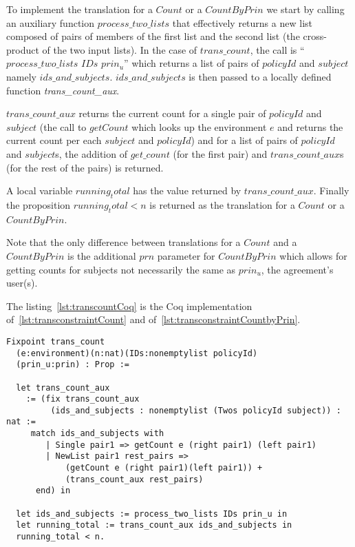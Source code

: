 To implement the translation for a $Count$ or a $CountByPrin$ we start by calling an auxiliary function $process\_two\_lists$ that effectively returns a new list composed of pairs of members of the first list and the second list (the cross-product of the two input lists). In the case of $trans\_count$, the call is ``$process\_two\_lists$ $IDs$ $prin_u$'' which returns a list of pairs of $policyId$ and $subject$ namely $ids\_and\_subjects$. $ids\_and\_subjects$ is then passed to a locally defined function \emph{trans_count_aux}.

$trans\_count\_aux$ returns the current count for a single pair of $policyId$ and $subject$ (the call to $getCount$ which looks up the environment $e$ and returns the current count per each $subject$ and $policyId$) and for a list of pairs of $policyId$ and $subject$s, the addition of $get\_count$ (for the first pair) and $trans\_count\_aux$s (for the rest of the pairs) is returned. 

A local variable $running_total$ has the value returned by $trans\_count\_aux$. Finally the proposition $running_total < n$ is returned as the translation for a $Count$ or a $CountByPrin$.

Note that the only difference between translations for a $Count$ and a $CountByPrin$ is the additional $prn$ parameter for $CountByPrin$ which allows for getting counts for subjects not necessarily the same as $prin_{u}$, the agreement's user(s).

The listing~\ref{lst:transcountCoq} is the Coq implementation of~\ref{lst:transconstraintCount} and of~\ref{lst:transconstraintCountbyPrin}.

\begin{minipage}[c]{0.95\textwidth}
\begin{lstlisting}
Fixpoint trans_count 
  (e:environment)(n:nat)(IDs:nonemptylist policyId)
  (prin_u:prin) : Prop := 

  let trans_count_aux 
    := (fix trans_count_aux
         (ids_and_subjects : nonemptylist (Twos policyId subject)) : nat :=
     match ids_and_subjects with
        | Single pair1 => getCount e (right pair1) (left pair1)
        | NewList pair1 rest_pairs =>
            (getCount e (right pair1)(left pair1)) +
            (trans_count_aux rest_pairs)
      end) in
  
  let ids_and_subjects := process_two_lists IDs prin_u in
  let running_total := trans_count_aux ids_and_subjects in
  running_total < n.
\end{lstlisting}
\end{minipage}